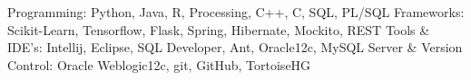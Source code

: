 \begin{cvskills}
  \cvskill
    {Programming:}
    {Python, Java, R, Processing, C++, C, SQL, PL/SQL}
  \cvskill
    {Frameworks:}
    {Scikit-Learn, Tensorflow, Flask, Spring, Hibernate, Mockito, REST}
  \cvskill
    {Tools \& IDE's:}
    {Intellij, Eclipse, SQL Developer, Ant, Oracle12c, MySQL}
  \cvskill
    {Server \& Version Control:}
    {Oracle Weblogic12c, git, GitHub, TortoiseHG}
\end{cvskills}